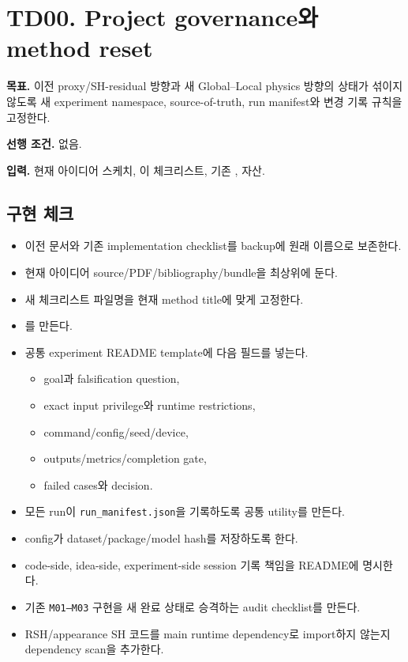 \documentclass[10pt,a4paper]{article}
\newcommand{\done}{\textcolor{DoneGreen}{\(\boxtimes\)}}
\newcommand{\code}[1]{\texttt{#1}}
\newcommand{\artifact}[1]{\textcolor{ProgressBlue}{\nolinkurl{#1}}}
\begin{document}
\newpage
\section{TD00. Project governance와 method reset}

\textbf{목표.} 이전 proxy/SH-residual 방향과 새 Global--Local physics 방향의 상태가 섞이지 않도록
새 experiment namespace, source-of-truth, run manifest와 변경 기록 규칙을 고정한다.

\textbf{선행 조건.} 없음.

\textbf{입력.}
현재 아이디어 스케치, 이 체크리스트, 기존 ,  자산.

\subsection*{구현 체크}

\begin{itemize}
  \item[\done] 이전 문서와 기존 implementation checklist를 backup에 원래 이름으로 보존한다.
  \item[\done] 현재 아이디어 source/PDF/bibliography/bundle을  최상위에 둔다.
  \item[\done] 새 체크리스트 파일명을 현재 method title에 맞게 고정한다.
  \item[\done] 를 만든다.
  \item[\done] 공통 experiment README template에 다음 필드를 넣는다.
    \begin{itemize}
      \item goal과 falsification question,
      \item exact input privilege와 runtime restrictions,
      \item command/config/seed/device,
      \item outputs/metrics/completion gate,
      \item failed cases와 decision.
    \end{itemize}
  \item[\done] 모든 run이 \artifact{run_manifest.json}을 기록하도록 공통 utility를 만든다.
  \item[\done] config가 dataset/package/model hash를 저장하도록 한다.
  \item[\done] code-side, idea-side, experiment-side session 기록 책임을 README에 명시한다.
  \item[\done] 기존 \code{M01--M03} 구현을 새 완료 상태로 승격하는 audit checklist를 만든다.
  \item[\done] RSH/appearance SH 코드를 main runtime dependency로 import하지 않는지 dependency scan을 추가한다.
\end{itemize}
\end{document}
